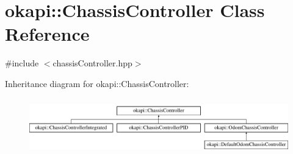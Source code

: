 \hypertarget{classokapi_1_1ChassisController}{}\section{okapi\+::Chassis\+Controller Class Reference}
\label{classokapi_1_1ChassisController}


{\ttfamily \#include $<$chassis\+Controller.\+hpp$>$}

Inheritance diagram for okapi\+::Chassis\+Controller\+:\begin{figure}[H]
\begin{center}
\leavevmode
\includegraphics[height=2.445415cm]{classokapi_1_1ChassisController}
\end{center}
\end{figure}
